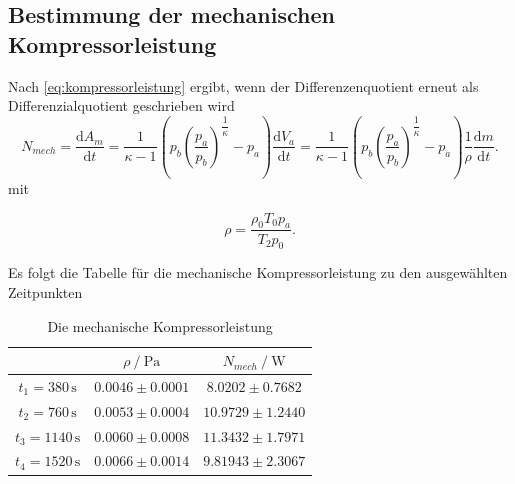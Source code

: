 \subsection{Bestimmung der mechanischen Kompressorleistung}

Nach \eqref{eq:kompressorleistung} ergibt, wenn der Differenzenquotient erneut als Differenzialquotient geschrieben wird
\begin{equation}
N_{mech}= \dfrac{\text{d}A_m}{\text{d}t} = \dfrac{1}{κ-1} \left(p_b\left(\dfrac{p_a}{p_b}\right)^{\dfrac{1}{κ}}-p_a\right) \dfrac{\text{d}V_a}{\text{d}t} = 
    \dfrac{1}{κ-1} \left (p_b \left(\dfrac{p_a}{p_b} \right)^{\dfrac{1}{κ}}-p_a \right) \dfrac{1}{ρ}\dfrac{\text{d}m}{\text{d}t}.
\end{equation}
mit 

\begin{equation*}
\rho = \dfrac{\rho_0 T_0 p_a}{T_2 p_0}.
\end{equation*}

Es folgt die Tabelle für die mechanische Kompressorleistung zu den ausgewählten Zeitpunkten
\begin{table}[H]
  \centering
  \label{tab:kompressorleistung2}
  \begin{tabular}{S S S}
    \toprule
    & {$\rho \mathbin{/} \unit{\pascal}$}&{$N_{mech} \mathbin{/} \unit{\watt}$} \\
    \midrule
    {$t_1 = 380  \, \unit{\second}$} & {$0.0046 \pm 0.0001$} & {$ 8.0202 \pm 0.7682$} \\
    {$t_2 = 760  \, \unit{\second}$} & {$0.0053 \pm 0.0004$} & {$10.9729 \pm 1.2440$} \\
    {$t_3 = 1140 \, \unit{\second}$} & {$0.0060 \pm 0.0008$} & {$11.3432 \pm 1.7971$} \\
    {$t_4 = 1520 \, \unit{\second}$} & {$0.0066 \pm 0.0014$} & {$9.81943 \pm 2.3067$} \\
    \bottomrule
  \end{tabular}
  \caption{Die mechanische Kompressorleistung}
\end{table}


%




